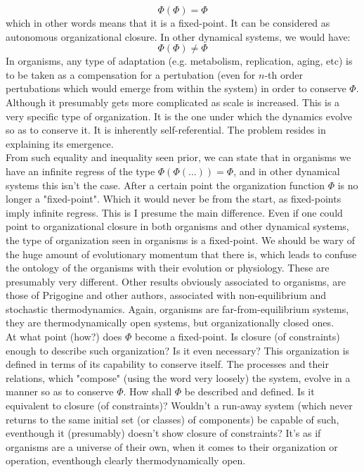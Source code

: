 \documentclass[a4paper,12pt,twoside,leqno]{article}
\begin{document}
$$
\Phi (\Phi) = \Phi
$$
which in other words means that it is a fixed-point. It can be considered as autonomous organizational closure. In other dynamical systems, we would have:
$$
\Phi (\Phi) \neq \Phi
$$
In organisms, any type of adaptation (e.g. metabolism, replication, aging, etc) is to be taken as a compensation for a pertubation (even for $n$-th order pertubations which would emerge from within the system) in order to conserve $\Phi$. Although it presumably gets more complicated as scale is increased. This is a very specific type of organization. It is the one under which the dynamics evolve so as to conserve it. It is inherently self-referential. The problem resides in explaining its emergence.\\
From such equality and inequality seen prior, we can state that in organisms we have an infinite regress of the type $\Phi(\Phi(...)) = \Phi$, and in other dynamical systems this isn't the case. After a certain point the organization function $\Phi$ is no longer a "fixed-point". Which it would never be from the start, as fixed-points imply infinite regress. This is I presume the main difference. Even if one could point to organizational closure in both organisms and other dynamical systems, the type of organization seen in organisms is a fixed-point. We should be wary of the huge amount of evolutionary momentum that there is, which leads to confuse the ontology of the organisms with their evolution or physiology. These are presumably very different. Other results obviously associated to organisms, are those of Prigogine and other authors, associated with non-equilibrium and stochastic thermodynamics. Again, organisms are far-from-equilibrium systems, they are thermodynamically open systems, but organizationally closed ones. \\
At what point (how?) does $\Phi$ become a fixed-point. Is closure (of constraints) enough to describe such organization? Is it even necessary? This organization is defined in terms of its capability to conserve itself. The processes and their relations, which "compose" (using the word very loosely) the system, evolve in a manner so as to conserve $\Phi$. How shall $\Phi$ be described and defined. Is it equivalent to closure (of constraints)? Wouldn't a run-away system (which never returns to the same initial set (or classes) of components) be capable of such, eventhough it (presumably) doesn't show closure of constraints? It's as if organisms are a universe of their own, when it comes to their organization or operation, eventhough clearly thermodynamically open.
\end{document}

